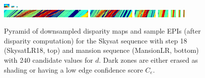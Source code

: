 \documentclass{article}
\theoremstyle{definition}
\begin{document}
\begin{figure}[th]
  \includegraphics[width=0.025\textwidth]{images/pyr/1522286815730_pyr_depth_004.png}
  \includegraphics[width=0.0125\textwidth]{images/pyr/1522286815730_pyr_depth_005.png}
  \includegraphics[width=0.00625\textwidth]{images/pyr/1522286815730_pyr_depth_006.png}\\
  \includegraphics[width=0.4\textwidth]{images/pyr/1522286815730_pyr_epi_000.png}
  \includegraphics[width=0.2\textwidth]{images/pyr/1522286815730_pyr_epi_001.png}
  \includegraphics[width=0.1\textwidth]{images/pyr/1522286815730_pyr_epi_002.png}
  \includegraphics[width=0.05\textwidth]{images/pyr/1522286815730_pyr_epi_003.png}
  \includegraphics[width=0.025\textwidth]{images/pyr/1522286815730_pyr_epi_004.png}
  \includegraphics[width=0.0125\textwidth]{images/pyr/1522286815730_pyr_epi_005.png}
  \includegraphics[width=0.00625\textwidth]{images/pyr/1522286815730_pyr_epi_006.png}
  \caption{Pyramid of downsampled disparity maps and sample EPIs (after disparity computation) for the Skysat sequence with step 18 (SkysatLR18, top) and mansion sequence (MansionLR, bottom) with $240$ candidate values for $d$. Dark zones are either erased as shading or having a low edge confidence score $C_e$.}
  \label{fig:pyramid}
\end{figure}
\end{document}
